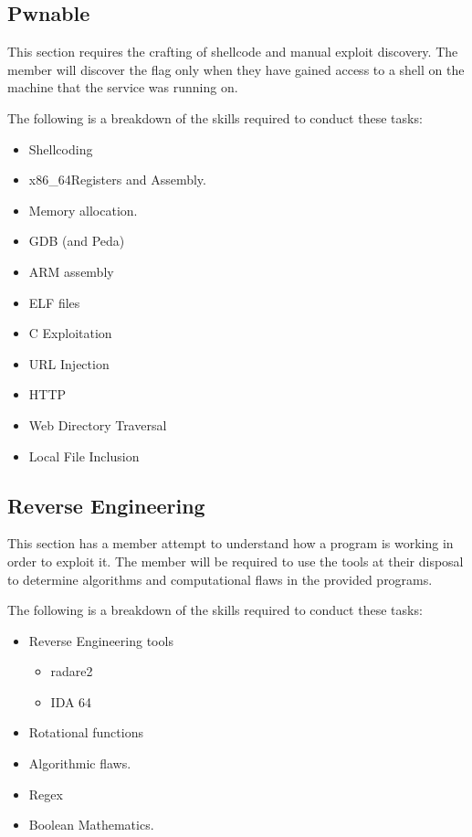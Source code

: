 \documentclass[a4paper,11pt]{report}
\begin{document}
		\subsection{Pwnable}
			This section requires the crafting of shellcode and manual exploit discovery. 
			The member will discover the flag only when they have gained access to a shell on the machine that the service was running on. 

			The following is a breakdown of the skills required to conduct these tasks:
			\begin{itemize}
				\item Shellcoding
				\item x86\_64Registers and Assembly. 
				\item Memory allocation. 
				\item GDB (and Peda)
				\item ARM assembly
				\item ELF files
				\item C Exploitation
				\item URL Injection
				\item HTTP
				\item Web Directory Traversal
				\item Local File Inclusion
			\end{itemize}
		\subsection{Reverse Engineering}
			This section has a member attempt to understand how a program is working in order to exploit it. 
			The member will be required to use the tools at their disposal to determine algorithms and computational flaws in the provided programs. 

			The following is a breakdown of the skills required to conduct these tasks:
			\begin{itemize}
				\item Reverse Engineering tools
					\begin{itemize}
						\item radare2
						\item IDA 64
					\end{itemize}
				\item Rotational functions
				\item Algorithmic flaws. 
				\item Regex
				\item Boolean Mathematics. 
			\end{itemize}
	
\end{document}
